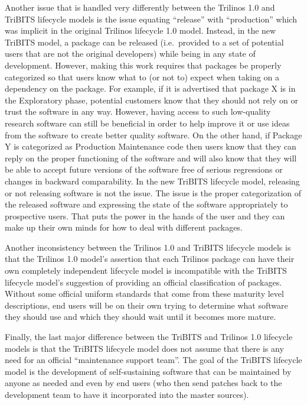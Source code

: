 \documentclass[11pt]{SANDreport}
\begin{document}
Another issue that is handled very differently between the Trilinos 1.0 and TriBITS lifecycle models is the issue equating ``release'' with ``production'' which was implicit in the original Trilinos lifecycle 1.0 model.  Instead, in the new TriBITS model, a package can be released (i.e.\ provided to a set of potential users that are not the original developers) while being in any state of development. However, making this work requires that packages be properly categorized so that users know what to (or not to) expect when taking on a dependency on the package.  For example, if it is advertised that package X is in the Exploratory phase, potential customers know that they should not rely on or trust the software in any way.  However, having access to such low-quality research software can still be beneficial in order to help improve it or use ideas from the software to create better quality software.  On the other hand, if Package Y is categorized as Production Maintenance code then users know that they can reply on the proper functioning of the software and will also know that they will be able to accept future versions of the software free of serious regressions or changes in backward comparability.  In the new TriBITS lifecycle model, releasing or not releasing software is not the issue.  The issue is the proper categorization of the released software and expressing the state of the software appropriately to prospective users.  That puts the power in the hands of the user and they can make up their own minds for how to deal with different packages.

Another inconsistency between the Trilinos 1.0 and TriBITS lifecycle models is that the Trilinos 1.0 model's assertion that each Trilinos package can have their own completely independent lifecycle model is incompatible with the TriBITS lifecycle model's suggestion of providing an official classification of packages.  Without some official uniform standards that come from these maturity level descriptions, end users will be on their own trying to determine what software they should use and which they should wait until it becomes more mature.

Finally, the last major difference between the TriBITS and Trilinos 1.0 lifecycle models is that the TriBITS lifecycle model does not assume that there is any need for an official ``maintenance support team''.  The goal of the TriBITS lifecycle model is the development of self-sustaining software that can be maintained by anyone as needed and even by end users (who then send patches back to the development team to have it incorporated into the master sources).
\end{document}

